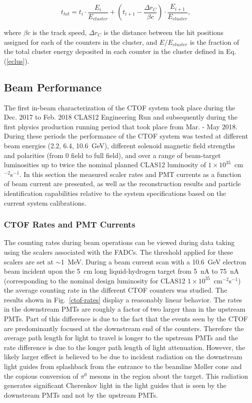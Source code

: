\documentclass{elsart}
\begin{document}
\begin{equation}
t_{hit} = t_i \cdot \frac{E_i}{E_{cluster}} + \left(t_{i+1} - \frac{\Delta r_C}{\beta c} \right)
\cdot \frac{E_{i+1}}{E_{cluster}},
\end{equation}

\noindent
where $\beta c$ is the track speed, $\Delta r_C$ is the distance between the hit positions assigned for each
of the counters in the cluster, and $E/E_{cluster}$ is the fraction of the total cluster energy deposited in
each counter in the cluster defined in Eq.(\ref{eclus}).
  
\subsection{Beam Performance}  
\label{sec:beam}

The first in-beam characterization of the CTOF system took place during the Dec. 2017 to Feb. 2018
CLAS12 Engineering Run and subsequently during the first physics production running period that
took place from Mar. - May 2018. During these periods the performance of the CTOF system was
tested at different beam energies (2.2, 6.4, 10.6~GeV), different solenoid magnetic field
strengths and polarities (from 0 field to full field), and over a range of beam-target
luminosities up to twice the nominal planned CLAS12 luminosity of $1 \times 10^{35}$~cm$^{-2}$s$^{-1}$.
In this section the measured scaler rates and PMT currents as a function of beam current are presented,
as well as the reconstruction results and particle identification capabilities relative to the system
specifications based on the current system calibrations.

\subsubsection{CTOF Rates and PMT Currents}

The counting rates during beam operations can be viewed during data taking using the scalers associated
with the FADCs. The threshold applied for these scalers are set at $\sim$1~MeV. During a beam current
scan with a 10.6~GeV electron beam incident upon the 5~cm long liquid-hydrogen target from 5~nA to 75~nA
(corresponding to the nominal design luminosity for CLAS12 $1 \times 10^{35}$~cm$^{-2}$s$^{-1}$) the
average counting rate in the different CTOF counters was studied. The results shown in Fig.~\ref{ctof-rates}
display a reasonably linear behavior. The rates in the downstream PMTs are roughly a factor of two larger
than in the upstream PMTs. Part of this difference is due to the fact that the events seen by the CTOF are
predominantly focused at the downstream end of the counters. Therefore the average path length for light to
travel is longer to the upstream PMTs and the rate difference is due to the longer path length of light attenuation.
However, the likely larger effect is believed to be due to incident radiation on the downstream light guides from
splashback from the entrance to the beamline M{\o}ller cone and the copious conversion of $\pi^0$ mesons in the
region about the target. This radiation generates significant Cherenkov light in the light guides that is seen by the
downstream PMTs and not by the upstream PMTs.
\end{document}
